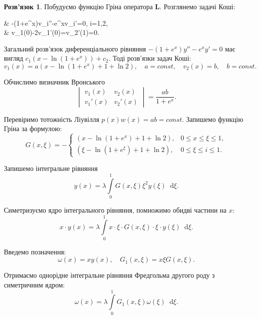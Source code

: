 \documentclass[a4paper, 12pt]{book}
\theoremstyle{definition}
\newtheorem*{solution*}{Розв'язок}
\newcommand*\diff{\mathop{}\!\mathrm{d}}
\renewcommand{\bf}[1]{\textbf{#1}}
\newcommand{\Int}{\displaystyle\int\limits}
\newenvironment{system*}{\begin{equation*} \left\{\begin{aligned}}{\end{aligned} \right. \end{equation*}}
\begin{document}
\begin{solution*}
	Побудуємо функцію Гріна оператора $\bf{L}$. Розглянемо задачі Коші:
	\begin{system*}
		& -(1+e^x)v_i''-e^xv_i'=0, \quad i=1,2,\\
		& v_1(0)-2v_1'(0)=v_2'(1)=0.
	\end{system*}

	Загальний розв’язок диференціального рівняння $-(1+e^x)y''-e^xy'=0$ має вигляд $c_1(x-\ln(1+e^x))+c_2$. Тоді розв’язки задач Коші:
	\[ v_1(x) = a(x - \ln(1+e^x)+1+\ln2), \quad a = const, \quad v_2(x) = b, \quad b = const. \]

	Обчислимо визначник Вронського \[\begin{vmatrix} v_1(x) & v_2(x) \\ v_1'(x) & v_2'(x) \end{vmatrix} = \dfrac{ab}{1+e^x}. \]

	Перевіримо тотожність Ліувілля $p(x)w(x) = ab = const$. Запишемо функцію Гріна за формулою:
	\[ G(x, \xi) = - \begin{cases} (x-\ln(1+e^x)+1+\ln2), & 0\le x \le \xi \le 1, \\ (\xi-\ln(1+e^\xi)+1+\ln2), & 0\le \xi \le i \le 1. \end{cases} \]

	Запишемо інтегральне рівняння \[y(x) = \lambda \Int_0^1 G(x,\xi)\xi^2y(\xi)\diff\xi. \]

	Симетризуємо ядро інтегрального рівняння, помножимо обидві частини на $x$: \[ x \cdot y(x) = \lambda \Int_0^1 x \cdot \xi \cdot G(x, \xi) \cdot \xi \cdot y(\xi) \diff \xi. \]

	Введемо позначення: \[ \omega(x) = xy(x), \quad G_1(x, \xi) = x\xi G(x,\xi).\]

	Отримаємо однорідне інтегральне рівняння Фредгольма другого роду з симетричним ядром: \[\omega(x) = \lambda \Int_0^1 G_1(x, \xi) \omega(\xi) \diff \xi.\]
\end{solution*}
\end{document}
